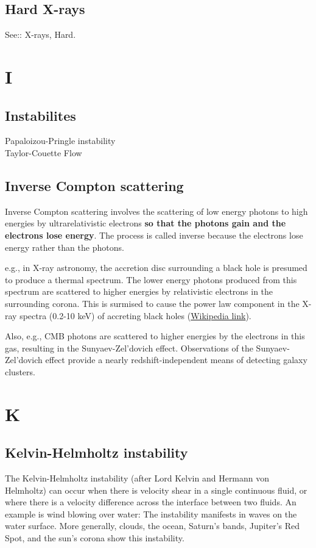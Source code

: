 \documentclass[11pt]{article}
\begin{document}
    \subsection*{Hard X-rays}
    See:: X-rays, Hard. 

\section*{I}
    \subsection*{Instabilites}
    Papaloizou-Pringle instability\\
    Taylor-Couette Flow\\

    \subsection*{Inverse Compton scattering}
    Inverse Compton scattering involves the scattering of low energy
    photons to high energies by ultrarelativistic electrons {\bf so that
      the photons gain and the electrons lose energy}. The process is called
    inverse because the electrons lose energy rather than the photons.

    e.g., in X-ray astronomy, the accretion disc surrounding a black
    hole is presumed to produce a thermal spectrum. The lower energy
    photons produced from this spectrum are scattered to higher energies
    by relativistic electrons in the surrounding corona. This is surmised
    to cause the power law component in the X-ray spectra (0.2-10 keV) of
    accreting black holes (\href{https://en.wikipedia.org/wiki/Compton\_scattering}{Wikipedia link}).

    Also, e.g., CMB photons are scattered to higher energies by the
    electrons in this gas, resulting in the Sunyaev-Zel'dovich
    effect. Observations of the Sunyaev-Zel'dovich effect provide a nearly
    redshift-independent means of detecting galaxy clusters.

\section*{K}
\subsection*{Kelvin-Helmholtz instability}
The Kelvin-Helmholtz instability (after Lord Kelvin and Hermann von
Helmholtz) can occur when there is velocity shear in a single
continuous fluid, or where there is a velocity difference across the
interface between two fluids. An example is wind blowing over water:
The instability manifests in waves on the water surface. More
generally, clouds, the ocean, Saturn's bands, Jupiter's Red Spot, and
the sun's corona show this instability. 
\end{document}
